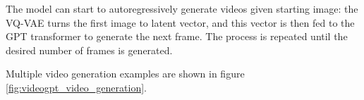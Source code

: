 The model can start to autoregressively generate videos given starting image: the VQ-VAE turns the first image to latent vector, and this vector is then fed to the GPT transformer to generate the next frame. The process is repeated until the desired number of frames is generated.

Multiple video generation examples are shown in figure \ref{fig:videogpt_video_generation}.